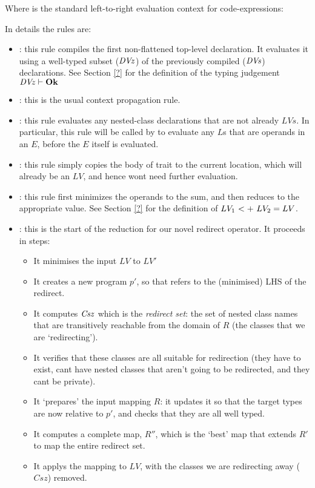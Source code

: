 Where  is the standard left-to-right evaluation context for code-expressions:\\
\indent\begin{bnf}
  {}
\end{bnf}

\noindent In details the rules are:
\begin{itemize}
	\item {}: this rule compiles the first non-flattened top-level declaration. It evaluates it using a well-typed subset ($\mathit{DVz}$) of the previously compiled ($\textit{DVs}$) declarations. See Section \ref{?} for the definition of the typing judgement $\mathit{DVz}\vdash\textbf{Ok}$ 
	\item {}: this is the usual context propagation rule.
	\item {}: this rule evaluates any nested-class declarations that are not already $LVs$. In particular, this rule will be called by  to evaluate any $L$s that are operands in an $E$, before the $E$ itself is evaluated.
	\item {}: this rule simply copies the body of trait to the current location, which will already be an $LV$, and hence wont need further evaluation.
	\item {}: this rule first minimizes the operands to the sum, and then reduces to the appropriate value. See Section \ref{?} for the definition of $\summ{LV_1}{LV_2}=LV$.
	\item {}: this is the start of the reduction for our novel redirect operator. It proceeds in steps:
	\begin{itemize}
		\item It minimises the input $LV$ to $LV'$
		\item It creates a new program $p'$, so that  refers to the (minimised) LHS of the redirect.
		\item It computes $\mathit{Csz}$ which is the \emph{redirect set}: the set of nested class names that are transitively reachable from the domain of $R$ (the classes that we are `redirecting').
		\item It verifies that these classes are all suitable for redirection (they have to exist, cant have nested classes that aren't going to be redirected, and they cant be private).
		\item It `prepares' the input mapping $R$: it updates it so that the target types are now relative to $p'$, and checks that they are all well typed.
		\item It computes a complete map, $R''$, which is the `best' map that extends  $R'$ to map the entire redirect set.
		\item It applys the mapping to $LV$, with the classes we are redirecting away ($Csz$) removed.
	\end{itemize}
\end{itemize}

